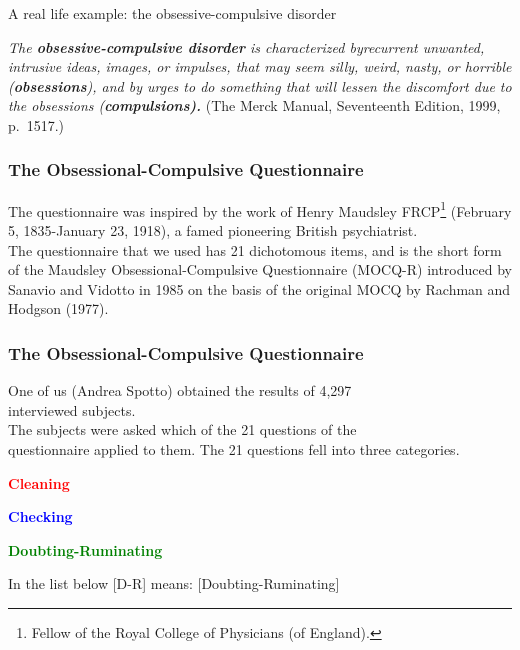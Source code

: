\documentclass{beamer}
\def\tl{\vskip 2mm}
\def\wl{\vskip 4mm}
\def\itbul{\item[$\bullet$]}
\def\rtxt#1{\textcolor{red}{#1}}
\def\btxt#1{\textcolor{blue}{#1}}
\def\grtxt#1{\textcolor{green}{#1}}
\begin{document}
\begin{frame}{A real life example: the obsessive-compulsive disorder}
\center
\begin{minipage}{10cm}
{\sl The {\bf obsessive-compulsive disorder} is characterized by\linebreak recurrent unwanted, intrusive ideas, images, or impulses, that may seem silly, weird, nasty, or horrible ({\bf obsessions}), and by urges to do something that will lessen the discomfort due to the obsessions (\bf compulsions).} (The Merck Manual, Seventeenth Edition, 1999, p.~1517.)
\end{minipage}
 \vspace{.5cm}

\end{frame}
\begin{frame}
\frametitle{ The Obsessional-Compulsive Questionnaire}
\center
\begin{minipage}{10cm} The questionnaire was inspired by the work of
Henry Maudsley FRCP\footnote{Fellow of the Royal College of Physicians (of England).} (February 5, 1835-January 23, 1918), a famed pioneering British psychiatrist.
\\[2mm]
The questionnaire that we used has 21 dichotomous items, and is the short form of the Maudsley Obsessional-Compulsive Questionnaire (MOCQ-R) introduced by Sanavio and Vidotto in 1985 on the basis of the original MOCQ by Rachman and Hodgson (1977).
\wl
\wl
\wl
\end{minipage}
 \vspace{.5cm}

\end{frame}
\begin{frame}
\frametitle{ The Obsessional-Compulsive Questionnaire}
\center
\begin{minipage}{10cm} 
One of us (Andrea Spotto) obtained the results of 4,297\\ interviewed subjects.\\[2mm]
The subjects were asked which of the 21 questions  of the\\ questionnaire applied to them.
\tl
The 21 questions fell into three categories.
\begin{roster}
\itbul  \rtxt{\bf Cleaning}
\itbul  \btxt{\bf Checking}
\itbul  \grtxt{\bf Doubting-Ruminating}
\end{roster}
In the list below [D-R] means: [Doubting-Ruminating]
\end{minipage}
 \vspace{.5cm}

\end{frame}
\end{document}
